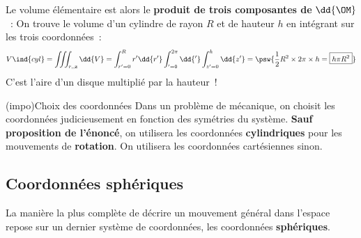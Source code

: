 \documentclass[../../main/main.tex]{subfiles}
\begin{document}
Le volume élémentaire est alors le \textbf{produit de trois composantes de}
$\dd{\OM}$~:
\psw{
  \[
  \boxed{\dd{V} = r \dd{r} \dd{\tt} \dd{z}}
\]
}
On trouve le volume d'un cylindre de rayon $R$ et de hauteur $h$ en
intégrant sur les trois coordonnées~:
\[V\ind{cyl} = \iiint_{r,\tt,z} \dd{V} =
  \int_{r'=0}^{R} r'\dd{r'}
  \int_{\tt'=0}^{2\pi} \dd{\tt'}
	\int_{z'=0}^{h} \dd{z'} =
  \psw{
    \frac{1}{2}R^2\times 2\pi \times h = \boxed{h\pi R^2}
  }
\]
C'est l'aire d'un disque multiplié par la hauteur~!

\begin{tcb*}(impo){Choix des coordonnées}
	Dans un problème de mécanique, on choisit les coordonnées judicieusement en
	fonction des symétries du système. \textbf{Sauf proposition de l'énoncé}, on
	utilisera les coordonnées \textbf{cylindriques} pour les mouvements de
	\textbf{rotation}. On utilisera les coordonnées cartésiennes sinon.
\end{tcb*}

\subsection{Coordonnées sphériques}
La manière la plus complète de décrire un mouvement général dans l'espace repose
sur un dernier système de coordonnées, les coordonnées \textbf{sphériques}.
\end{document}

